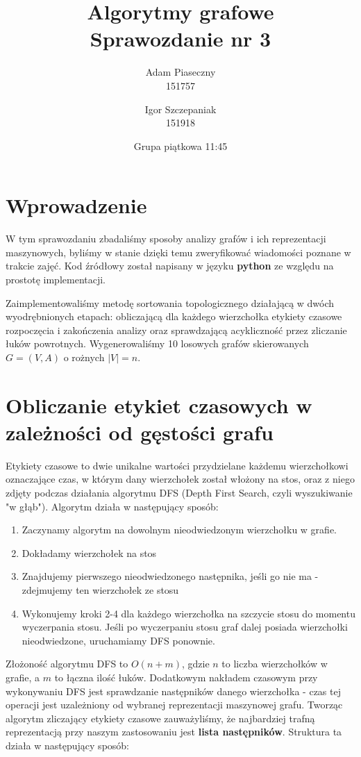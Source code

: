 \documentclass{article}
\title{\LARGE Algorytmy grafowe\\ Sprawozdanie nr 3}
\author{Adam Piaseczny \\	151757 \and
				Igor Szczepaniak \\ 151918}
\date{Grupa piątkowa 11:45}
\begin{document}
\maketitle
\pagebreak

\tableofcontents
\pagebreak

\section{Wprowadzenie}

W tym sprawozdaniu zbadaliśmy sposoby analizy grafów i ich reprezentacji maszynowych, byliśmy w stanie dzięki temu zweryfikować wiadomości poznane w trakcie zajęć. Kod źródłowy został napisany w języku \textbf{python} ze względu na prostotę implementacji.

Zaimplementowaliśmy metodę sortowania topologicznego działającą w dwóch wyodrębnionych etapach: obliczającą dla każdego wierzchołka etykiety czasowe rozpoczęcia i zakończenia analizy oraz sprawdzającą acykliczność przez zliczanie łuków powrotnych. Wygenerowaliśmy 10 losowych grafów skierowanych $G=(V,A)$ o rożnych $|V|=n$.

\section{Obliczanie etykiet czasowych w zależności od gęstości grafu}

Etykiety czasowe to dwie unikalne wartości przydzielane każdemu wierzchołkowi oznaczające czas, w którym dany wierzchołek został włożony na stos, oraz z niego zdjęty podczas działania algorytmu DFS (Depth First Search, czyli wyszukiwanie "w głąb"). Algorytm działa w następujący sposób:

\begin{enumerate}
\item Zaczynamy algorytm na dowolnym nieodwiedzonym wierzchołku w grafie.
\item Dokładamy wierzchołek na stos
\item Znajdujemy pierwszego nieodwiedzonego następnika, jeśli go nie ma - zdejmujemy ten wierzchołek ze stosu
\item Wykonujemy kroki 2-4 dla każdego wierzchołka na szczycie stosu do momentu wyczerpania stosu. Jeśli po wyczerpaniu stosu graf dalej posiada wierzchołki nieodwiedzone, uruchamiamy DFS ponownie.
\end{enumerate}

Złożoność algorytmu DFS to $O(n+m)$, gdzie $n$ to liczba wierzchołków w grafie, a $m$ to łączna ilość łuków. Dodatkowym nakładem czasowym przy wykonywaniu DFS jest sprawdzanie następników danego wierzchołka - czas tej operacji jest uzależniony od wybranej reprezentacji maszynowej grafu. Tworząc algorytm zliczający etykiety czasowe zauważyliśmy, że najbardziej trafną reprezentacją przy naszym zastosowaniu jest \textbf{lista następników}. Struktura ta działa w następujący sposób:
\end{document}
